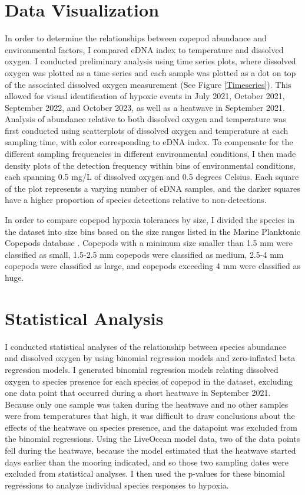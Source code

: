 \documentclass[12pt,twoside]{reedthesis}
\begin{document}
	\section{Data Visualization}
	In order to determine the relationships between copepod abundance and environmental factors, I compared eDNA index to temperature and dissolved oxygen. I conducted preliminary analysis using time series plots, where dissolved oxygen was plotted as a time series and each sample was plotted as a dot on top of the associated dissolved oxygen measurement (See Figure \ref{Timeseries}). This allowed for visual identification of hypoxic events in July 2021, October 2021, September 2022, and October 2023, as well as a heatwave in September 2021. Analysis of abundance relative to both dissolved oxygen and temperature was first conducted using scatterplots of dissolved oxygen and temperature at each sampling time, with color corresponding to eDNA index. To compensate for the different sampling frequencies in different environmental conditions, I then made density plots of the detection frequency within bins of environmental conditions, each spanning 0.5 mg/L of dissolved oxygen and 0.5 degrees Celsius. Each square of the plot represents a varying number of eDNA samples, and the darker squares have a higher proportion of species detections relative to non-detections. 
	
	In order to compare copepod hypoxia tolerances by size, I divided the species in the dataset into size bins based on the size ranges listed in the Marine Planktonic Copepods database \autocite{WoRMSWorldRegister}. Copepods with a minimum size smaller than 1.5 mm were classified as small, 1.5-2.5 mm copepods were classified as medium, 2.5-4 mm copepods were classified as large, and copepods exceeding 4 mm were classified as huge.
	
	\section{Statistical Analysis}
	I conducted statistical analyses of the relationship between species abundance and dissolved oxygen by using binomial regression models and zero-inflated beta regression models. I generated binomial regression models relating dissolved oxygen to species presence for each species of copepod in the dataset, excluding one data point that occurred during a short heatwave in September 2021. Because only one sample was taken during the heatwave and no other samples were from temperatures that high, it was difficult to draw conclusions about the effects of the heatwave on species presence, and the datapoint was excluded from the binomial regressions. Using the LiveOcean model data, two of the data points fell during the heatwave, because the model estimated that the heatwave started days earlier than the mooring indicated, and so those two sampling dates were excluded from statistical analyses. I then used the p-values for these binomial regressions to analyze individual species responses to hypoxia. 
	
\end{document}
